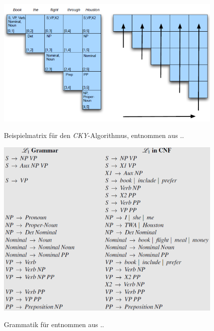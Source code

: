 \begin{figure} [h]
\includegraphics[width=\textwidth]{gfx/cky-beispiel.png} 
\label{fig:cky-beispiel}	
\caption{Beispielmatrix für den \textit{CKY}-Algorithmus, entnommen aus .. %
}	
\end{figure}

\begin{figure} [h]
\includegraphics[width=\textwidth]{gfx/grammatik-cky-beispiel.png} 
\label{fig:cky-beispiel}	
\caption{Grammatik für  entnommen aus .. %
}	
\end{figure}

